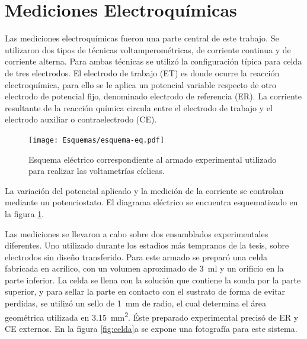 \section{Mediciones Electroquímicas}\label{sec:medidas_eq}
		
			Las mediciones electroquímicas fueron una parte central de este trabajo. Se utilizaron dos tipos de técnicas voltamperométricas, de corriente continua y de corriente alterna. 	%
			Para ambas técnicas se utilizó la configuración típica para celda de tres electrodos.\cite{Wi2000} El electrodo de trabajo (ET) es donde ocurre la reacción electroquímica, para ello se le aplica un potencial variable respecto de otro electrodo de potencial fijo, denominado electrodo de referencia (ER). La corriente resultante de la reacción química circula entre el electrodo de trabajo y el electrodo auxiliar o contraelectrodo (CE). 

					\begin{figure}[h!]
			 		  \begin{center}
			 		  \texttt{[image: Esquemas/esquema-eq.pdf]}
			 		  \caption[Circuito eléctrico EQ]{Esquema eléctrico correspondiente al armado experimental utilizado para realizar las voltametrías cíclicas.}
			 		  \label{fig:eq-circuito}
			 		  \end{center}
			 		  \end{figure}

			La variación del potencial aplicado y la medición de la corriente se controlan mediante un potenciostato. El diagrama eléctrico se encuentra esquematizado en la figura \ref{fig:eq-circuito}.

			Las mediciones se llevaron a cabo sobre dos ensamblados experimentales diferentes. Uno utilizado durante los estadios más tempranos de la tesis, sobre electrodos sin diseño transferido. Para este armado se preparó una celda fabricada en acrílico, con un volumen aproximado de \SI{3}{\ml} y un orificio en la parte inferior. La celda se llena con la solución que contiene la sonda por la parte superior, y para sellar la parte en contacto con el sustrato de forma de evitar perdidas, se utilizó un sello de \SI{1}{\mm} de radio, el cual determina el área geométrica utilizada en \SI{3.15}{\mm^{2}}. Éste preparado experimental precisó de ER y CE externos. En la figura \ref{fig:celda}a se expone una fotografía para este sistema. 

